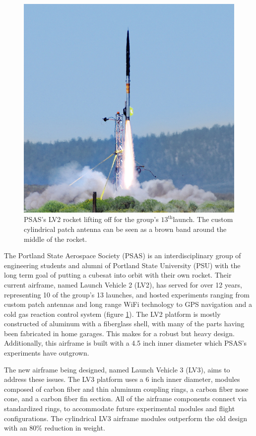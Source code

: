 \documentclass{aiaa-tc}%
\newcommand{\weightReduction}{80\%}
\begin{document}
\begin{figure}
\centering
\includegraphics[width=\linewidth]{../img/L12-cropped.png}
\caption{PSAS's LV2 rocket lifting off for the group's $13^\text{th}$launch. The custom cylindrical patch antenna can be seen as a brown band around the middle of the rocket.}
\label{fig:L-12}
\end{figure}

The Portland State Aerospace Society (PSAS) is an interdisciplinary group of engineering students and alumni of Portland State University (PSU) with the long term goal of putting a cubesat into orbit with their own rocket. 
Their current airframe, named Launch Vehicle 2 (LV2), has served for over 12 years, representing 10 of the group's 13 launches, and hosted experiments ranging from custom patch antennas and long range WiFi technology to GPS navigation and a cold gas reaction control system (figure \ref{fig:L-12}). The LV2 platform is mostly constructed of aluminum with a fiberglass shell, with many of the parts having been fabricated in home garages. This makes for a robust but heavy design. Additionally, this airframe is built with a 4.5 inch inner diameter which PSAS's experiments have outgrown. 

The new airframe being designed, named Launch Vehicle 3 (LV3), aims to address these issues. The LV3 platform uses a 6 inch inner diameter, modules composed of carbon fiber and thin aluminum coupling rings, a carbon fiber nose cone, and a carbon fiber fin section. All of the airframe components connect via standardized rings, to accommodate future experimental modules and flight configurations.
The cylindrical LV3 airframe modules outperform the old design with an \weightReduction{} reduction in weight.
\end{document}

